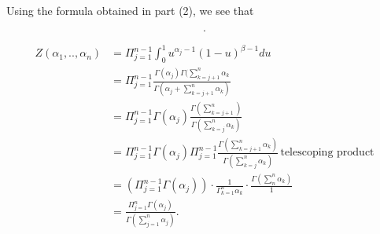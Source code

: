
Using the formula obtained in part (2), we see that 

\[
.\] 

\begin{align*}
    Z(\alpha_1, .., \alpha_{n}) &= \Pi_{j=1}^{n-1} \int_{0}^{1} u^{\alpha_{j} -1} (1-u)^{\beta - 1}
    du \\
				&=\Pi_{j=1}^{n-1}  \frac{\Gamma(\alpha_{j} ) \Gamma(
				\sum_{k=j+1}^{n} \alpha_{k} }{\Gamma(\alpha_{j} + \sum_{k=j+1}^{n}
			    \alpha_{k}	)} \\
				&= \Pi_{j=1}^{n-1} \Gamma(\alpha_{j} ) \frac{\Gamma(
				\sum_{k=j+1}^{n})}{\Gamma( \sum_{k=j}^{n} \alpha_{k}) } \\
				&= \Pi_{j=1}^{n-1} \Gamma(\alpha_{j} ) \Pi_{j=1}^{n-1} \frac{
				\Gamma(\sum_{k=j+1}^{n} \alpha_{k}) }{\Gamma( \sum_{k=j}^{n}
			\alpha_{k})}\, \mbox{telescoping product} \\
			&= (\Pi_{j=1}^{n-1} \Gamma(\alpha_{j} )) \cdot \frac{1}{\Gamma_{k=1}^{n}
			\alpha_{k}} \cdot \frac{\Gamma( \sum_{n}^{n} \alpha_{k} ) }{1}  \\
			&= \frac{\Pi_{j=1}^{n} \Gamma(\alpha_{j} )}{ \Gamma( \sum_{j=1}^{n}
			\alpha_{j} )}. 
\end{align*}
